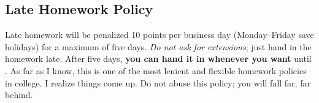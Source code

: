 \subsection*{Late Homework Policy}

Late homework will be penalized 10 points per business day (Monday--Friday save holidays) for a maximum of five days. \textit{Do not ask for extensions}; just hand in the homework late. After five days, \textbf{you can hand it in whenever you want} until \lastdatetimetohandinhomeworks. As far as I know, this is one of the most lenient and flexible homework policies in college. I realize things come up. Do not abuse this policy; you will fall far, far behind.